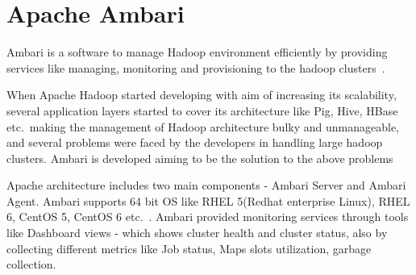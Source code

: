 \section{Apache Ambari}  

Ambari is a software  to manage Hadoop environment
efficiently by providing services like managing, monitoring and provisioning to
the hadoop clusters~\cite{hid-sp18-401-wiki-Ambari}.

When Apache Hadoop started developing with aim of increasing its scalability,
several application layers started to cover its architecture like Pig, Hive,
HBase etc.\ making the management of Hadoop architecture bulky and unmanageable,
and several problems were faced by the developers in handling large hadoop
clusters. Ambari is developed aiming to be the solution to the above problems


Apache architecture includes two main components - Ambari Server and Ambari
Agent. Ambari supports 64 bit OS like RHEL 5(Redhat enterprise Linux), RHEL 6,
CentOS 5, CentOS 6 etc.~\cite{hid-sp18-401-Ambari}. Ambari provided monitoring
services through tools like Dashboard views - which shows cluster health and
cluster status, also by collecting different metrics like Job status, Maps slots
utilization, garbage collection.

